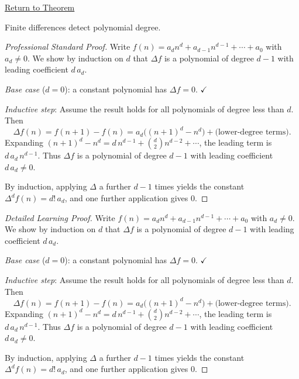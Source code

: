 \newpage
{}
\label{prf:polynomial-detection}

\begin{remark*}[Return]
\hyperref[thm:polynomial-detection]{Return to Theorem}
\end{remark*}

\begin{theorem*}
Finite differences detect polynomial degree.
\end{theorem*}

\begin{proof}[Professional Standard Proof]
\LRAProofBodyStart
Write \(f(n) = a_d n^d + a_{d-1}n^{d-1} + \cdots + a_0\) with \(a_d \ne 0\).
We show by induction on \(d\) that \(\Delta f\) is a polynomial of degree
\(d-1\) with leading coefficient \(d\,a_d\).

\emph{Base case} (\(d = 0\)): a constant polynomial has \(\Delta f = 0\). \(\checkmark\)

\emph{Inductive step}: Assume the result holds for all polynomials of degree
less than \(d\). Then
\[
\Delta f(n) = f(n+1)-f(n)
= a_d\bigl((n+1)^d - n^d\bigr) + \text{(lower-degree terms)}.
\]
Expanding \((n+1)^d - n^d = d\,n^{d-1} + \binom{d}{2}n^{d-2} + \cdots\),
the leading term is \(d\,a_d\,n^{d-1}\). Thus \(\Delta f\) is a polynomial
of degree \(d-1\) with leading coefficient \(d\,a_d \ne 0\).

By induction, applying \(\Delta\) a further \(d-1\) times yields the
constant \(\Delta^d f(n) = d!\,a_d\), and one further application gives \(0\).
\end{proof}

\begin{proof}[Detailed Learning Proof]
\LRAProofBodyStart
Write \(f(n) = a_d n^d + a_{d-1}n^{d-1} + \cdots + a_0\) with \(a_d \ne 0\).
We show by induction on \(d\) that \(\Delta f\) is a polynomial of degree
\(d-1\) with leading coefficient \(d\,a_d\).

\emph{Base case} (\(d = 0\)): a constant polynomial has \(\Delta f = 0\). \(\checkmark\)

\emph{Inductive step}: Assume the result holds for all polynomials of degree
less than \(d\). Then
\[
\Delta f(n) = f(n+1)-f(n)
= a_d\bigl((n+1)^d - n^d\bigr) + \text{(lower-degree terms)}.
\]
Expanding \((n+1)^d - n^d = d\,n^{d-1} + \binom{d}{2}n^{d-2} + \cdots\),
the leading term is \(d\,a_d\,n^{d-1}\). Thus \(\Delta f\) is a polynomial
of degree \(d-1\) with leading coefficient \(d\,a_d \ne 0\).

By induction, applying \(\Delta\) a further \(d-1\) times yields the
constant \(\Delta^d f(n) = d!\,a_d\), and one further application gives \(0\).
\end{proof}


